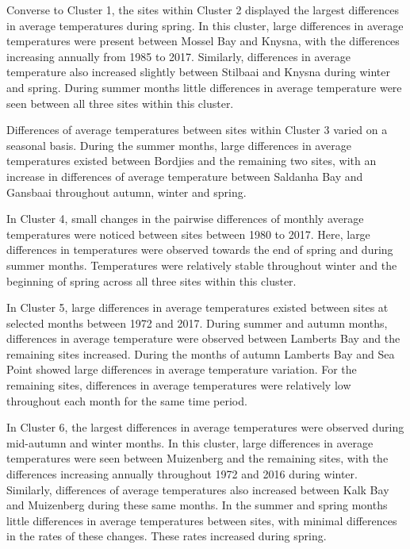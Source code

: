 \documentclass[12pt,a4paper,]{article}
\begin{document}
Converse to Cluster 1, the sites within Cluster 2 displayed the largest
differences in average temperatures during spring. In this cluster,
large differences in average temperatures were present between Mossel
Bay and Knysna, with the differences increasing annually from 1985 to
2017. Similarly, differences in average temperature also increased
slightly between Stilbaai and Knysna during winter and spring. During
summer months little differences in average temperature were seen
between all three sites within this cluster.

Differences of average temperatures between sites within Cluster 3
varied on a seasonal basis. During the summer months, large differences
in average temperatures existed between Bordjies and the remaining two
sites, with an increase in differences of average temperature between
Saldanha Bay and Gansbaai throughout autumn, winter and spring.

In Cluster 4, small changes in the pairwise differences of monthly
average temperatures were noticed between sites between 1980 to 2017.
Here, large differences in temperatures were observed towards the end of
spring and during summer months. Temperatures were relatively stable
throughout winter and the beginning of spring across all three sites
within this cluster.

In Cluster 5, large differences in average temperatures existed between
sites at selected months between 1972 and 2017. During summer and autumn
months, differences in average temperature were observed between
Lamberts Bay and the remaining sites increased. During the months of
autumn Lamberts Bay and Sea Point showed large differences in average
temperature variation. For the remaining sites, differences in average
temperatures were relatively low throughout each month for the same time
period.

In Cluster 6, the largest differences in average temperatures were
observed during mid-autumn and winter months. In this cluster, large
differences in average temperatures were seen between Muizenberg and the
remaining sites, with the differences increasing annually throughout
1972 and 2016 during winter. Similarly, differences of average
temperatures also increased between Kalk Bay and Muizenberg during these
same months. In the summer and spring months little differences in
average temperatures between sites, with minimal differences in the
rates of these changes. These rates increased during spring.
\end{document}
